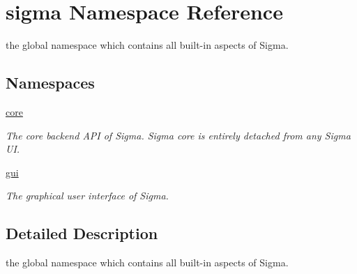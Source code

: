 \hypertarget{namespacesigma}{\section{sigma Namespace Reference}
\label{namespacesigma}
}


the global namespace which contains all built-\/in aspects of Sigma.  


\subsection*{Namespaces}
\begin{DoxyCompactItemize}
\item 
\hyperlink{namespacesigma_1_1core}{core}
\begin{DoxyCompactList}\small\item\em The core backend A\-P\-I of Sigma. Sigma core is entirely detached from any Sigma U\-I. \end{DoxyCompactList}\item 
\hyperlink{namespacesigma_1_1gui}{gui}
\begin{DoxyCompactList}\small\item\em The graphical user interface of Sigma. \end{DoxyCompactList}\end{DoxyCompactItemize}


\subsection{Detailed Description}
the global namespace which contains all built-\/in aspects of Sigma. 